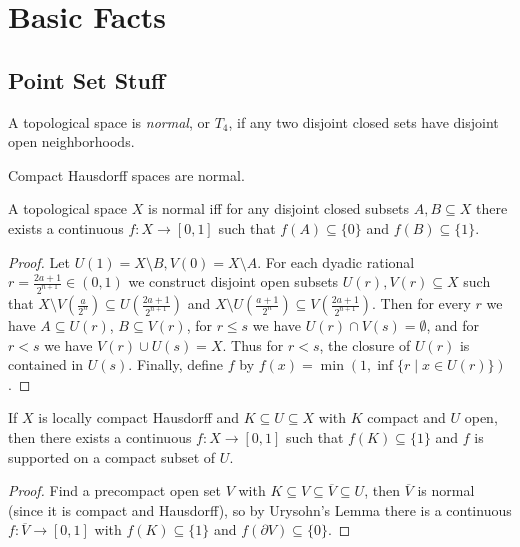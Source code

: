 \section{Basic Facts}

\subsection{Point Set Stuff}

\begin{defn} A topological space is \emph{normal}, or $T_4$, if any two disjoint closed sets have disjoint open neighborhoods.
\end{defn}

\begin{prop} Compact Hausdorff spaces are normal.
\end{prop}

\begin{lem}\label{urysohn} A topological space $X$ is normal iff for any disjoint closed subsets $A,B \subseteq X$ there exists a continuous $f : X \rightarrow [0,1]$ such that $f(A) \subseteq \{0\}$ and $f(B) \subseteq \{1\}$.
\end{lem}
\begin{proof} Let $U(1) = X\setminus B, V(0) = X\setminus A$. For each dyadic rational $r = \frac{2a+1}{2^{n+1}} \in (0,1)$ we construct disjoint open subsets $U(r), V(r) \subseteq X$ such that $X \setminus V(\frac{a}{2^n}) \subseteq U(\frac{2a+1}{2^{n+1}})$ and $X\setminus U(\frac{a+1}{2^n}) \subseteq V(\frac{2a+1}{2^{n+1}})$. Then for every $r$ we have $A \subseteq U(r)$, $B \subseteq V(r)$, for $r \le s$ we have $U(r) \cap V(s) = \emptyset$, and for $r < s$ we have $V(r) \cup U(s) = X$. Thus for $r < s$, the closure of $U(r)$ is contained in $U(s)$. Finally, define $f$ by $f(x) = \min(1,\inf\{r \mid x \in U(r)\})$.
\end{proof}

\begin{lem}\label{lch-urysohn} If $X$ is locally compact Hausdorff and $K \subseteq U \subseteq X$ with $K$ compact and $U$ open, then there exists a continuous $f : X \rightarrow [0,1]$ such that $f(K) \subseteq \{1\}$ and $f$ is supported on a compact subset of $U$.
\end{lem}
\begin{proof} Find a precompact open set $V$ with $K \subseteq V \subseteq \overline{V} \subseteq U$, then $\overline{V}$ is normal (since it is compact and Hausdorff), so by Urysohn's Lemma there is a continuous $f : \overline{V} \rightarrow [0,1]$ with $f(K) \subseteq \{1\}$ and $f(\partial V) \subseteq \{0\}$.
\end{proof}

